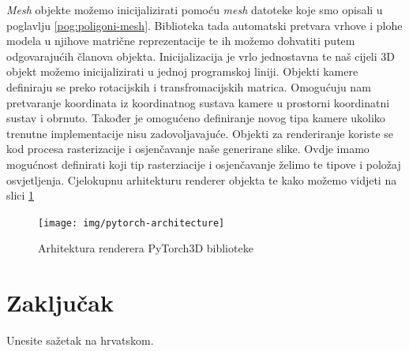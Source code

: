 \documentclass[times, utf8, diplomskirad]{fer}
\begin{document}
\textit{Mesh} objekte možemo inicijalizirati pomoću \textit{mesh} datoteke koje smo opisali u poglavlju \ref{pog:poligoni-mesh}.
Biblioteka tada automatski pretvara vrhove i plohe modela u njihove matrične reprezentacije te ih možemo dohvatiti putem odgovarajućih članova objekta.
Inicijalizacija je vrlo jednostavna te naš cijeli 3D objekt možemo inicijalizirati u jednoj programskoj liniji.
Objekti kamere definiraju se preko rotacijskih i transfromacijskih matrica.
Omogućuju nam pretvaranje koordinata iz koordinatnog sustava kamere u prostorni koordinatni sustav i obrnuto.
Također je omogućeno definiranje novog tipa kamere ukoliko trenutne implementacije nisu zadovoljavajuće.
Objekti za renderiranje koriste se kod procesa rasterizacije i osjenčavanje naše generirane slike.
Ovdje imamo mogućnost definirati koji tip rasterziacije i osjenčavanje želimo te tipove i položaj osvjetljenja.
Cjelokupnu arhitekturu renderer objekta te kako možemo vidjeti na slici \ref{fig:pytorch-architecture}

\begin{figure}[H]
    \centering
    \texttt{[image: img/pytorch-architecture]}
    \caption{Arhitektura renderera PyTorch3D biblioteke}
    \label{fig:pytorch-architecture}
\end{figure}

\chapter{Zaključak}
\label{pog:zakljucak}









\begin{sazetak}
  Unesite sažetak na hrvatskom.

  \blindtext
\end{sazetak}
\end{document}
